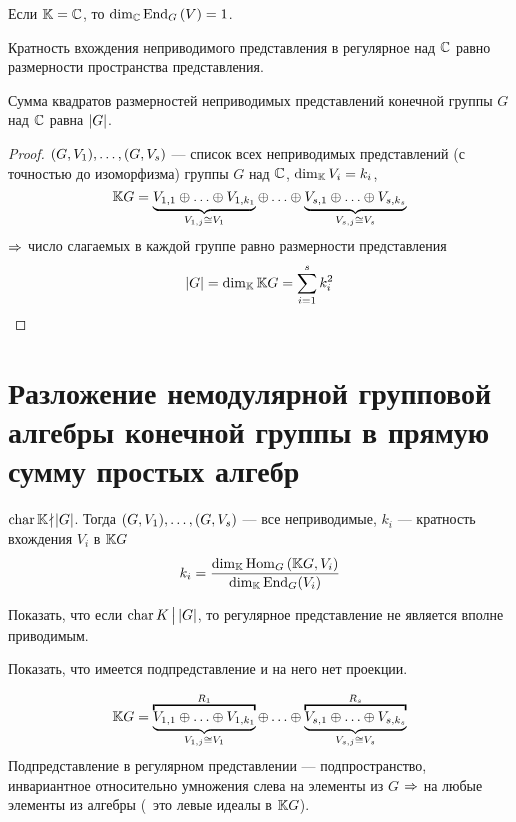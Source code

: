 Если $\mathbb{K} = \mathbb{C}$, то $\dim_{\mathbb{C}} \operatorname{End}_{G} \left(V\right) = 1$.
\begin{stm}
	Кратность вхождения неприводимого представления в регулярное над $\mathbb{C}$
	равно размерности пространства представления.
\end{stm}
\begin{imp}\label{SquaresAmount}
	Сумма квадратов размерностей неприводимых представлений
	конечной группы $G$ над $\mathbb{C}$ равна $\left|G\right|$.
\end{imp}
\begin{proof}
	$(G, V_1) ,\ldots, (G, V_s)$ --- список всех неприводимых представлений (с точностью до изоморфизма)
	группы $G$ над $\mathbb{C}$, $\dim_{\mathbb{K}} V_i = k_i$,
	$$
		\K G = \ub{V_{1,1} \sop V_{1,k_1}}_{V_{1, j} \cong V_1} \sop
		\ub{V_{s,1} \sop V_{s,k_s}}_{V_{s, j} \cong V_s}
	$$
	$\Rightarrow$ число слагаемых в каждой группе равно размерности представления
	$$
		\left|G\right| = \dim_{\mathbb{K}} \mathbb{K} G = \sum_{i = 1}^s k_i^2
	$$
\end{proof}


\section{Разложение немодулярной групповой алгебры конечной группы в прямую сумму простых алгебр}
$\operatorname{char} \mathbb{K} \!\nmid\! \left|G\right|$.
Тогда $(G, V_1) ,\ldots, (G, V_s)$ --- все неприводимые,
$k_i$ --- кратность вхождения $V_i$ в $\mathbb{K} G$
$$
	k_i = \frac{\dim_{\mathbb{K}}\operatorname{Hom}_G\left(\mathbb{K} G, V_i\right)}{\dim_{\mathbb{K}}\operatorname{End}_G(V_i)}
$$
\begin{problem}
	Показать, что если $\operatorname{char} K \,\bigl\rvert\, \left|G\right|$,
	то регулярное представление не является вполне приводимым.
\end{problem}
\begin{hint}
	Показать, что имеется подпредставление и на него нет проекции.
\end{hint}
\begin{equation}\label{SplEq}
	\K G = \obt{\ub{V_{1,1} \sop V_{1,k_1}}_{V_{1, j} \cong V_1}}^{R_1} \sop
	\obt{\ub{V_{s,1} \sop V_{s,k_s}}_{V_{s, j} \cong V_s}}^{R_s}
\end{equation}
Подпредставление в регулярном представлении --- подпространство,
инвариантное относительно умножения слева на элементы из $G$ $\Rightarrow$
на любые элементы из алгебры
(\ie\ это левые идеалы в $\mathbb{K} G$).

